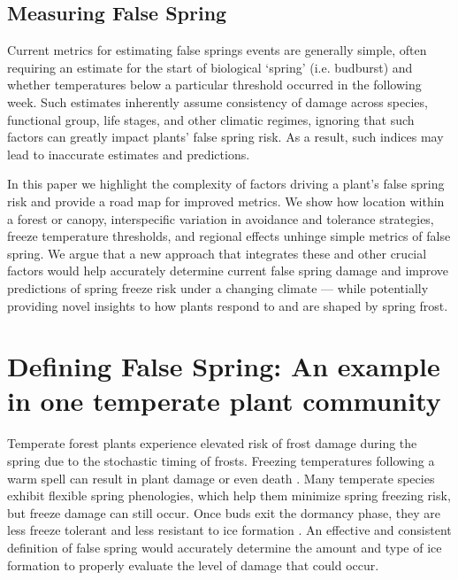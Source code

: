\documentclass{article}\usepackage[]{graphicx}\usepackage[]{color}
\begin{document}
\subsection*{Measuring False Spring}
Current metrics for estimating false springs events are generally simple, often requiring an estimate for the start of biological `spring' (i.e. budburst) and whether temperatures below a particular threshold occurred in the following week. Such estimates inherently assume consistency of damage across species, functional group, life stages, and other climatic regimes, ignoring that such factors can greatly impact plants' false spring risk. As a result, such indices may lead to inaccurate estimates and predictions. %

In this paper we highlight the complexity of factors driving a plant's false spring risk and provide a road map for improved metrics. We show how location within a forest or canopy, interspecific variation in avoidance and tolerance strategies, freeze temperature thresholds, and regional effects unhinge simple metrics of false spring. We argue that a new approach that integrates these and other crucial factors would help accurately determine current false spring damage and improve predictions of spring freeze risk under a changing climate --- while potentially providing novel insights to how plants respond to and are shaped by spring frost. %

\section*{Defining False Spring: An example in one temperate plant community}
Temperate forest plants experience elevated risk of frost damage during the spring due to the stochastic timing of frosts. Freezing temperatures following a warm spell can result in plant damage or even death \citep{Ludlum1968, Mock2007}. Many temperate species exhibit flexible spring phenologies, which help them minimize spring freezing risk, but freeze damage can still occur. Once buds exit the dormancy phase, they are less freeze tolerant and less resistant to ice formation \citep{Taschler2004, Lenz2013, Vitasse2014a}. %
An effective and consistent definition of false spring would accurately determine the amount and type of ice formation to properly evaluate the level of damage that could occur.
 
\end{document}
